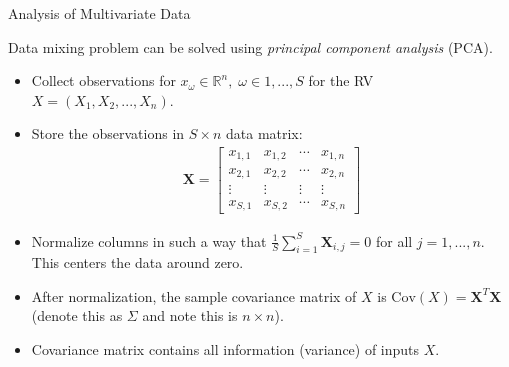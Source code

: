\documentclass[9pt]{beamer}
\begin{document}
%
\begin{frame}{Analysis of Multivariate Data}

Data mixing problem can be solved using {\em principal component analysis} (PCA). 

\begin{itemize}
\item Collect observations for $x_\omega\in \mathbb{R}^n,\; \omega \in 1,...,S$ for the RV $X=(X_1,X_2,...,X_n)$.  
\item Store the observations in $S\times n$ data matrix: 
\begin{align*}
\mathbf{X}=\left[\begin{array}{ccccccc}x_{1,1}&x_{1,2}&\cdots &x_{1,n}\\
x_{2,1}&x_{2,2}&\cdots &x_{2,n}\\
\vdots&\vdots&\vdots &\vdots\\
x_{S,1}&x_{S,2}&\cdots&x_{S,n}
\end{array}
\right]
\end{align*}
\item Normalize columns in such a way that $\frac{1}{S}\sum_{i=1}^S\mathbf{X}_{i,j}=0$ for all $j=1,...,n$.  This centers the data around zero. 
\item After normalization, the sample covariance matrix of $X$ is $\textrm{Cov}(X)=\mathbf{X}^T\mathbf{X}$ (denote this as $\Sigma$ and note this is $n\times n$). 
\item Covariance matrix contains all information (variance) of inputs $X$. 


\end{itemize}


\end{frame}
\end{document}
